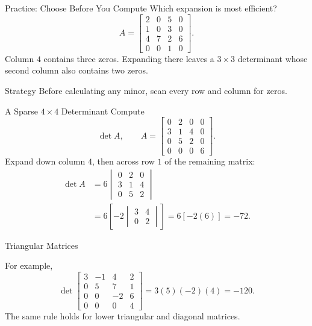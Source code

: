 \begin{frame}{Practice: Choose Before You Compute}
Which expansion is most efficient?
\[
A=\begin{bmatrix}
2&0&5&0\\
1&0&3&0\\
4&7&2&6\\
0&0&1&0
\end{bmatrix}.
\]
\pause
Column $4$ contains three zeros. Expanding there leaves a $3\times3$ determinant whose second column also contains two zeros.
\pause
\begin{block}{Strategy}
Before calculating any minor, scan every row and column for zeros.
\end{block}
\end{frame}

\begin{frame}{A Sparse $4\times4$ Determinant}
Compute
\[
\det A,
\qquad
A=\begin{bmatrix}
0&2&0&0\\
3&1&4&0\\
0&5&2&0\\
0&0&0&6
\end{bmatrix}.
\]
\pause
Expand down column $4$, then across row $1$ of the remaining matrix:
\begin{align*}
\det A
&=6\begin{vmatrix}0&2&0\\3&1&4\\0&5&2\end{vmatrix}\\
&=6\left[-2\begin{vmatrix}3&4\\0&2\end{vmatrix}\right]
=6[-2(6)]=-72.
\end{align*}
\end{frame}

\begin{frame}{Triangular Matrices}
\medskip

For example,
\[
\det\begin{bmatrix}
3&-1&4&2\\
0&5&7&1\\
0&0&-2&6\\
0&0&0&4
\end{bmatrix}
=3(5)(-2)(4)=-120.
\]
\pause
The same rule holds for lower triangular and diagonal matrices.
\end{frame}


